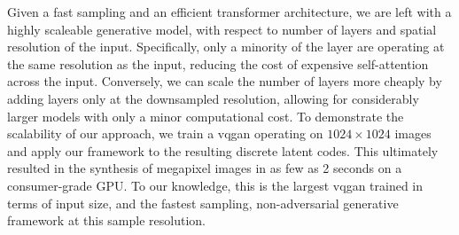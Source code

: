 Given a fast sampling and an efficient transformer architecture, we are left
with a highly scaleable generative model, with respect to number of layers and
spatial resolution of the input. Specifically, only a minority of the layer are
operating at the same resolution as the input, reducing the cost of expensive
self-attention across the input. Conversely, we can scale the number of layers
more cheaply by adding layers only at the downsampled resolution, allowing for
considerably larger models with only a minor computational cost. To demonstrate
the scalability of our approach, we train a \gls{vqgan} operating on $1024
\times 1024$ images and apply our framework to the resulting discrete latent
codes. This ultimately resulted in the synthesis of megapixel images in as few
as 2 seconds on a consumer-grade GPU. To our knowledge, this is the largest
\gls{vqgan} trained in terms of input size, and the fastest sampling,
non-adversarial generative framework at this sample resolution.


